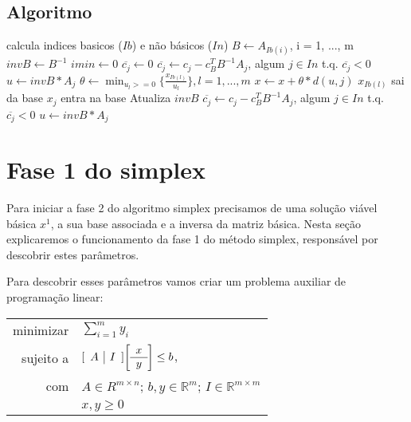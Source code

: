 \documentclass[12pt]{article}
\begin{document}
\subsection{Algoritmo}
\begin{algorithmic}
	\State calcula indices basicos ($Ib$) e não básicos ($In$)
    \State $B \gets  A_{Ib(i)}$, i = 1, ..., m
    \State $invB \gets B^{-1}$
   	\State $imin \gets 0$
        \State $\overline{c_{j}} \gets 0$
   	\Else
	\State $\overline{c_{j}} \gets c_{j} - c_{B}^{T}B^{-1}A_{j}$, algum $j \in In$ t.q. $\overline{c_{j}} < 0$
    \State $u \gets invB * A_{j}$  
    \EndIf 
        	\State {}
        \EndIf
    	\State $\theta \gets \min_{u_{l} >= 0} \{\frac{x_{Ib(l)}} {u_{l}}\}, l = 1, ... , m$
        \State $x \gets x + \theta * d(u, j)$
        \State $x_{Ib(l)}$ sai da base 
        \State $x_{j}$ entra na base 
        \State Atualiza $invB$
	    \State $\overline{c_{j}} \gets c_{j} - c_{B}^{T}B^{-1}A_{j}$, algum $j \in In$ t.q. $\overline{c_{j}} < 0$ 
        \State $u \gets invB * A_{j}$  
    \EndWhile
    \State {}
\EndFunction

\end{algorithmic}



\section{Fase 1 do simplex}
	Para iniciar a fase 2 do algoritmo simplex precisamos de uma solução viável básica $x^1$, a sua base associada e a inversa da matriz básica. Nesta seção explicaremos o funcionamento da fase 1 do método simplex, responsável por descobrir estes parâmetros.

Para descobrir esses parâmetros vamos criar um problema auxiliar de programação linear:

\begin{center}
	\begin{tabular}{r l}
		minimizar & $\sum_{i = 1}^{m} y_i$ \\
		sujeito a & $
					[\begin{array}{c | c}
						A & I
					\end{array}]
					
					\bigg[\begin{array}{c}
						x \\
						\hline
						y
					\end{array}\bigg]
					
					\leq b$, \\
			com   &	$A \in R^{m \times n}$; $b, y \in \mathbb{R}^m$; $I \in \mathbb{R}^{m \times m}$ \\
            & $x, y \geq 0$
	\end{tabular}
\end{center}
\end{document}
